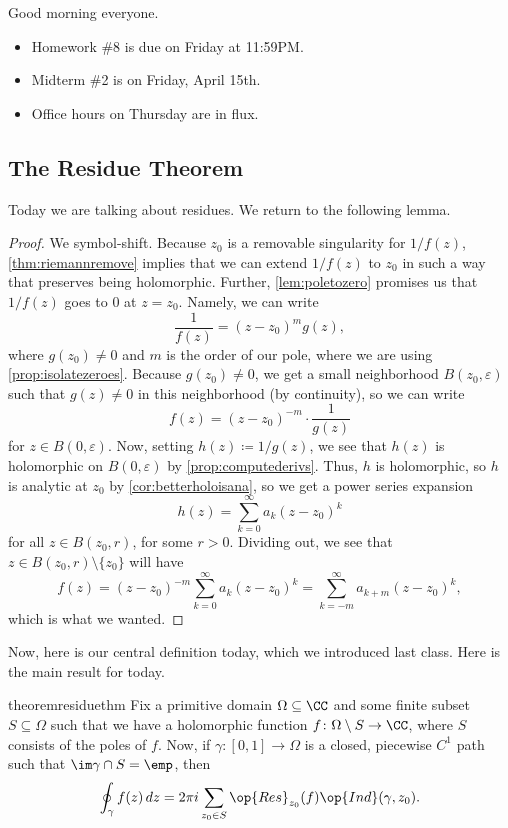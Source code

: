 \documentclass[../notes.tex]{subfiles}
\begin{document}

Good morning everyone.
\begin{itemize}
	\item Homework \#8 is due on Friday at 11:59PM.
	\item Midterm \#2 is on Friday, April 15th.
	\item Office hours on Thursday are in flux.
\end{itemize}

\subsection{The Residue Theorem}
Today we are talking about residues. We return to the following lemma.
\laurent*
\begin{proof}
	We symbol-shift. Because $z_0$ is a removable singularity for $1/f(z)$, \autoref{thm:riemannremove} implies that we can extend $1/f(z)$ to $z_0$ in such a way that preserves being holomorphic. Further, \autoref{lem:poletozero} promises us that $1/f(z)$ goes to $0$ at $z=z_0$. Namely, we can write
	\[\frac1{f(z)}=(z-z_0)^mg(z),\]
	where $g(z_0)\ne0$ and $m$ is the order of our pole, where we are using \autoref{prop:isolatezeroes}. Because $g(z_0)\ne0$, we get a small neighborhood $B(z_0,\varepsilon)$ such that $g(z)\ne0$ in this neighborhood (by continuity), so we can write
	\[f(z)=(z-z_0)^{-m}\cdot\frac1{g(z)}\]
	for $z\in B(0,\varepsilon)$. Now, setting $h(z)\coloneqq 1/g(z)$, we see that $h(z)$ is holomorphic on $B(0,\varepsilon)$ by \autoref{prop:computederivs}. Thus, $h$ is holomorphic, so $h$ is analytic at $z_0$ by \autoref{cor:betterholoisana}, so we get a power series expansion
	\[h(z)=\sum_{k=0}^\infty a_k(z-z_0)^k\]
	for all $z\in B(z_0,r)$, for some $r>0$. Dividing out, we see that $z\in B(z_0,r)\setminus\{z_0\}$ will have
	\[f(z)=(z-z_0)^{-m}\sum_{k=0}^\infty a_k(z-z_0)^k=\sum_{k=-m}^\infty a_{k+m}(z-z_0)^k,\]
	which is what we wanted.
\end{proof}
Now, here is our central definition today, which we introduced last class.
\resideudef*
\noindent Here is the main result for today.
\begin{restatable}[Residue]{theorem}{residuethm} \label{thm:residue}
	Fix a primitive domain $\Omega\subseteq\CC$ and some finite subset $S\subseteq\Omega$ such that we have a holomorphic function $f\colon \Omega\setminus S\to\CC$, where $S$ consists of the poles of $f$. Now, if $\gamma\colon [0,1]\to\Omega$ is a closed, piecewise $C^1$ path such that $\im\gamma\cap S=\emp$, then
	\[\oint_\gamma f(z)\,dz=2\pi i\sum_{z_0\in S}\op{Res}_{z_0}(f)\op{Ind}(\gamma,z_0).\]
\end{restatable}
\end{document}
